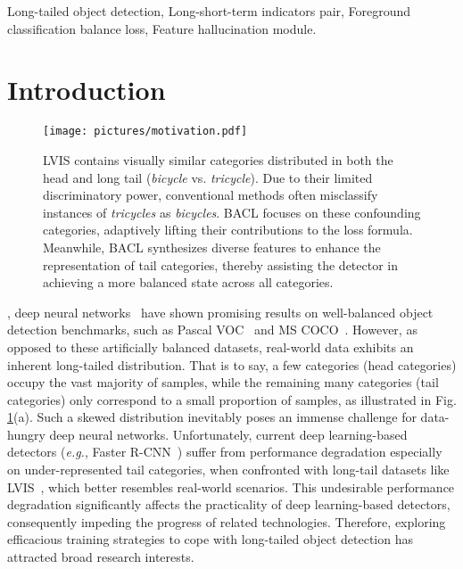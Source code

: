 \documentclass[lettersize,journal]{IEEEtran}
\begin{document}
\begin{IEEEkeywords}
Long-tailed object detection, Long-short-term indicators pair, Foreground classification balance loss, Feature hallucination module.
\end{IEEEkeywords}

\section{Introduction}

\begin{figure}[!t]
  \centering
  \texttt{[image: pictures/motivation.pdf]}
  \caption{LVIS contains visually similar categories distributed in both the head and long tail ({\em bicycle} vs. {\em tricycle}). Due to their limited discriminatory power, conventional methods often misclassify instances of {\em tricycles} as {\em bicycles}. BACL focuses on these confounding categories, adaptively lifting their contributions to the loss formula. Meanwhile, BACL synthesizes diverse features to enhance the representation of tail categories, thereby assisting the detector in achieving a more balanced state across all categories.}
  \label{pic:1}
\end{figure}

, deep neural networks~\cite{yang2020captionnet,qiu2017learning,zhan2019unmanned,wu2021deep,li2021online,wang2021data,li2022deep,ge2021semantic,cai2019exploring,li2016deepsaliency} have shown promising results on well-balanced object detection benchmarks, such as Pascal VOC~\cite{everingham2010pascal} and MS COCO~\cite{lin2014microsoft}.
However, as opposed to these artificially balanced datasets, real-world data exhibits an inherent long-tailed distribution.
That is to say, a few categories (head categories) occupy the vast majority of samples, while the remaining many categories (tail categories) only correspond to a small proportion of samples, as illustrated in Fig. \ref{pic:1}(a). 
Such a skewed distribution inevitably poses an immense challenge for data-hungry deep neural networks.
Unfortunately, current deep learning-based detectors ({\em e.g.}, Faster R-CNN~\cite{ren2015faster}) suffer from performance degradation especially on under-represented tail categories, when confronted with long-tail datasets like LVIS~\cite{gupta2019lvis}, which better resembles real-world scenarios.
This undesirable performance degradation significantly affects the practicality of deep learning-based detectors, consequently impeding the progress of related technologies.
Therefore, exploring efficacious training strategies to cope with long-tailed object detection has attracted broad research interests.
\end{document}

